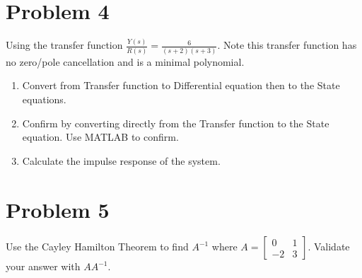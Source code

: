 \documentclass{article}
\begin{document}
\newpage
\section*{Problem 4}
Using the transfer function $\frac{Y(s)}{R(s)} = \frac{6}{(s+2)(s+3)}$.
\newline
Note this transfer function has no zero/pole cancellation and is a minimal polynomial.
\begin{enumerate}[1)]
\item Convert from Transfer function to Differential equation then to the State equations.
\newline
\item Confirm by converting directly from the Transfer function to the State equation.
{\color{blue} Use MATLAB to confirm.}
\newline
\item Calculate the impulse response of the system.
\newline
\end{enumerate}

\newpage
\section*{Problem 5}
Use the Cayley Hamilton Theorem to find $A^{-1}$ where $A = \begin{bmatrix} 0 & 1 \\ -2 & 3 \end{bmatrix}$.
Validate your answer with $AA^{-1}$.
\newline

\newpage
\end{document}
